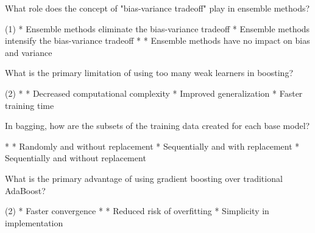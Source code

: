 \documentclass[11pt]{extarticle}
\begin{document}
\begin{exercise}
    What role does the concept of "bias-variance tradeoff" play in ensemble methods?
    \begin{choice} (1)
        * Ensemble methods eliminate the bias-variance tradeoff
        * Ensemble methods intensify the bias-variance tradeoff
        * 
        * Ensemble methods have no impact on bias and variance
    \end{choice}
\end{exercise}
\begin{solution}
\end{solution}

\begin{exercise}
    What is the primary limitation of using too many weak learners in boosting?
    \begin{choice} (2)
        * 
        * Decreased computational complexity
        * Improved generalization
        * Faster training time
    \end{choice}
\end{exercise}
\begin{solution}
\end{solution}

\begin{exercise}
    In bagging, how are the subsets of the training data created for each base model?
    \begin{choice}
        * 
        * Randomly and without replacement
        * Sequentially and with replacement
        * Sequentially and without replacement
    \end{choice}
\end{exercise}
\begin{solution}
\end{solution}

\begin{exercise}
    What is the primary advantage of using gradient boosting over traditional AdaBoost?
    \begin{choice} (2)
        * Faster convergence
        * 
        * Reduced risk of overfitting
        * Simplicity in implementation
    \end{choice}
\end{exercise}
\begin{solution}
\end{solution}
\end{document}
